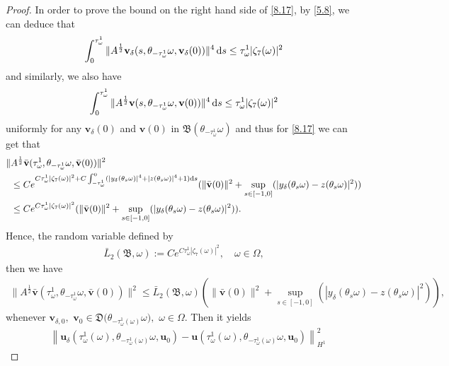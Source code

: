 \documentclass{elsarticle}
\theoremstyle{definition}
\numberwithin{equation}{section}
\renewcommand{\d}{{\rm{d}}}
\begin{document}
\begin{proof}
 In order to prove the bound on the right hand side of \eqref{8.17}, by \eqref{5.8}, we can deduce that
\begin{align*}
    \int_{0}^{\tau_\omega^1}  \|A^\frac12\textbf{v}_\delta(s, \theta_{-\tau_\omega^1}\omega, \textbf{v}_\delta(0)) \|^4 \, \d s  \leq  \tau_\omega^1 |\zeta_7(\omega)|^2
\end{align*}
and similarly, we also have
\begin{align*}
    \int_{0}^{\tau_\omega^1}  \|A^\frac12\textbf{v}(s, \theta_{-\tau_\omega^1}\omega, \textbf{v}(0)) \|^4 \, \d s  \leq  \tau_\omega^1 |\zeta_7(\omega)|^2
\end{align*}
uniformly for any  $\textbf{v}_\delta(0) $ and $\textbf{v}(0) $ in $  \mathfrak B( \theta_{-\tau_\omega^1} \omega)$ and thus  for \eqref{8.17} we can get that
\begin{align*}
  \|
 &A^{\frac 12} \bar {\textbf{v}}(\tau_\omega^1,\theta_{-\tau_\omega^1}\omega, \bar{\textbf{v}}(0))  \|^2\nonumber\\
&  \leq  Ce^{ C \tau_\omega^1  |\zeta_7( \omega)|^2 + C\int^0_{-\tau_\omega^1} (|y_\delta(\theta_s\omega)|^4+|z(\theta_s\omega)|^4+1) \d s}
   (\|\bar{\textbf{v}}(0)\|^2+\sup\limits_{s\in[-1,0]}(|y_\delta(\theta_s\omega)-z(\theta_s\omega)|^2 ))  \\
   &\leq Ce^{ C \tau_\omega^1  |\zeta_7( \omega)|^2 }(\|\bar{\textbf{v}}(0)\|^2+\sup\limits_{s\in[-1,0]}(|y_\delta(\theta_s\omega)-z(\theta_s\omega)|^2 )).
\end{align*}
Hence, the random variable defined by
\begin{align*}
  \bar{L}_2(\mathfrak B, \omega):=  Ce^{ C \tau_\omega^1  |\zeta_7( \omega)|^2 }
,\quad \omega\in \Omega,
\end{align*}
then we have
\begin{align*}
  \|
 A^{\frac 12} \bar {\textbf{v}}(\tau_\omega^1,\theta_{-\tau_\omega^1}\omega, \bar{\textbf{v}}(0))  \|^2
  \leq   \bar{L}_2(\mathfrak B, \omega)(\|\bar{\textbf{v}}(0)\|^2+\sup\limits_{s\in[-1,0]}
  (|y_\delta(\theta_s\omega)-z(\theta_s\omega)|^2 )),
\end{align*}
whenever $\textbf{v}_{\delta,0},$ $\textbf{v}_{0}\in \mathfrak D \big ( \theta_{-\tau_\omega^1( \omega)}\omega \big),$  $\omega\in \Omega$. Then it yields
\begin{align*}
&\left \| \textbf{u}_\delta \! \left ( \tau_\omega^1 (\omega) ,\theta_{-\tau_\omega^1(\omega)}\omega,  \textbf{u}_{0}\right)
 - \textbf{u} \! \left ( \tau_\omega^1 (\omega) ,\theta_{-\tau_\omega^1(\omega)}\omega, \textbf{u}_{0}\right) \right \|^2_{H^1}

\end{align*}
\end{proof}
\end{document}
